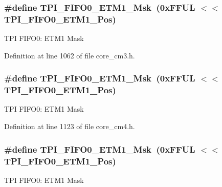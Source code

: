 \subsubsection[{\texorpdfstring{T\+P\+I\+\_\+\+F\+I\+F\+O0\+\_\+\+E\+T\+M1\+\_\+\+Msk}{TPI_FIFO0_ETM1_Msk}}]{\setlength{\rightskip}{0pt plus 5cm}\#define T\+P\+I\+\_\+\+F\+I\+F\+O0\+\_\+\+E\+T\+M1\+\_\+\+Msk~(0x\+F\+F\+U\+L $<$$<$ T\+P\+I\+\_\+\+F\+I\+F\+O0\+\_\+\+E\+T\+M1\+\_\+\+Pos)}\hypertarget{group___c_m_s_i_s___t_p_i_gaad9c1a6ed34a70905005a0cc14d5f01b}{}\label{group___c_m_s_i_s___t_p_i_gaad9c1a6ed34a70905005a0cc14d5f01b}
T\+PI F\+I\+F\+O0\+: E\+T\+M1 Mask 

Definition at line 1062 of file core\+\_\+cm3.\+h.

\subsubsection[{\texorpdfstring{T\+P\+I\+\_\+\+F\+I\+F\+O0\+\_\+\+E\+T\+M1\+\_\+\+Msk}{TPI_FIFO0_ETM1_Msk}}]{\setlength{\rightskip}{0pt plus 5cm}\#define T\+P\+I\+\_\+\+F\+I\+F\+O0\+\_\+\+E\+T\+M1\+\_\+\+Msk~(0x\+F\+F\+U\+L $<$$<$ T\+P\+I\+\_\+\+F\+I\+F\+O0\+\_\+\+E\+T\+M1\+\_\+\+Pos)}\hypertarget{group___c_m_s_i_s___t_p_i_gaad9c1a6ed34a70905005a0cc14d5f01b}{}\label{group___c_m_s_i_s___t_p_i_gaad9c1a6ed34a70905005a0cc14d5f01b}
T\+PI F\+I\+F\+O0\+: E\+T\+M1 Mask 

Definition at line 1123 of file core\+\_\+cm4.\+h.

\subsubsection[{\texorpdfstring{T\+P\+I\+\_\+\+F\+I\+F\+O0\+\_\+\+E\+T\+M1\+\_\+\+Msk}{TPI_FIFO0_ETM1_Msk}}]{\setlength{\rightskip}{0pt plus 5cm}\#define T\+P\+I\+\_\+\+F\+I\+F\+O0\+\_\+\+E\+T\+M1\+\_\+\+Msk~(0x\+F\+F\+U\+L $<$$<$ T\+P\+I\+\_\+\+F\+I\+F\+O0\+\_\+\+E\+T\+M1\+\_\+\+Pos)}\hypertarget{group___c_m_s_i_s___t_p_i_gaad9c1a6ed34a70905005a0cc14d5f01b}{}\label{group___c_m_s_i_s___t_p_i_gaad9c1a6ed34a70905005a0cc14d5f01b}
T\+PI F\+I\+F\+O0\+: E\+T\+M1 Mask 


